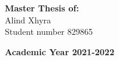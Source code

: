 \documentclass[a4paper,12pt]{report}
\begin{document}
\begin{titlepage}
        \begin{flushright}
            {\large \textbf{Master Thesis of:}} \\
            \large{Alind Xhyra} \\
            \large{Student number 829865} 
        \end{flushright}
        
        \vspace{30mm}
        \begin{center}
            {\large{\bf Academic Year 2021-2022}}
        \end{center}

        \restoregeometry
        
    \end{titlepage}
    
\end{document}
